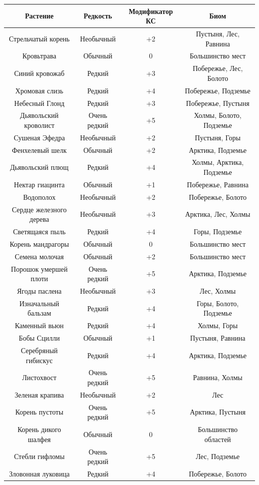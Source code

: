 \documentclass[a4paper, 9pt, twocolumn]{book}
\begin{document}
	\begin{tabular}{|c|c|c|c|}
		\hline
		\textbf{Растение} & \textbf{Редкость} & \textbf{Модификатор КС} & \textbf{Биом} \\
		\hline
		Стрельчатый корень & Необычный & +2 & Пустыня, Лес, Равнина \\
		\hline
		Кровьтрава & Обычный & 0 & Большинство мест \\
		\hline
		Синий кровожаб & Редкий & +3 & Побережье, Лес, Болото \\
		\hline
		Хромовая слизь & Редкий & +4 & Побережье, Подземье \\
		\hline
		Небесный Глонд & Редкий & +3 & Побережье, Пустыня \\
		\hline
		Дьявольский кроволист & Очень редкий & +5 & Холмы, Болото, Подземье \\
		\hline
		Сушеная Эфедра & Необычный & +2 & Пустыня, Горы \\
		\hline
		Фенхелевый шелк & Обычный & +2 & Арктика, Подземье \\
		\hline
		Дьявольский плющ & Редкий  & +4 & Холмы, Арктика, Подземье \\
		\hline
		Нектар гиацинта & Обычный & +1 & Побережье, Равнина \\
		\hline
		Водополох & Необычный & +2 & Побережье, Болото \\
		\hline
		Сердце железного дерева & Необычный & +3 & Арктика, Лес, Холмы \\
		\hline
		Светящаяся пыль & Редкий & +4 & Горы, Подземье \\
		\hline
		Корень мандрагоры & Обычный & 0 & Большинство мест \\
		\hline
		Семена молочая & Обычный & +2 & Большинство мест \\
		\hline
		Порошок умершей плоти & Очень редкий & +5 & Арктика, Подземье \\
		\hline
		Ягоды паслена & Необычный & +3 & Лес, Холмы \\
		\hline
		Изначальный бальзам & Редкий & +4 & Горы, Болото, Подземье \\
		\hline
		Каменный вьюн & Редкий & +4 & Холмы, Горы \\
		\hline
		Бобы Сцилли & Обычный & +1 & Пустыня, Равнина \\
		\hline
		Серебряный гибискус & Редкий & +4 & Арктика, Подземье \\
		\hline
		Листохвост & Очень редкий & +5 & Равнина, Холмы \\
		\hline
		Зеленая крапива & Необычный & +2 & Лес \\
		\hline
		Корень пустоты & Очень редкий & +5 & Арктика, Пустыня \\
		\hline
		Корень дикого шалфея & Обычный & 0 & Большинство областей \\
		\hline
		Стебли гифломы & Очень редкий & +5 & Лес, Подземье \\
		\hline
		Зловонная луковица & Редкий & +4 & Побережье, Болото \\
		\hline
	\end{tabular}
\end{document}
